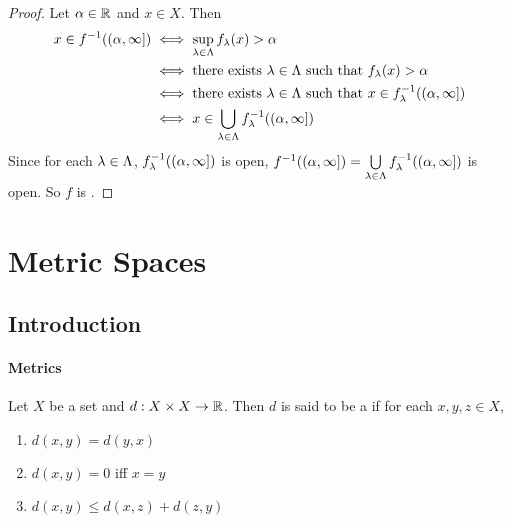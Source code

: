 \documentclass{book}
\begin{document}
	\begin{proof}
		Let $\alpha \in \mathbb{R}$ and $x \in X$. Then 
		\begin{align*}
			x \in f^{-1}((\alpha, \infty])
			& \iff \sup_{\lambda \in \Lambda} f_{\lambda}(x) > \alpha \\
			& \iff \text{there exists $\lambda \in \Lambda$ such that } f_{\lambda}(x) > \alpha \\
			& \iff \text{there exists $\lambda \in \Lambda$ such that } x \in f_{\lambda}^{-1}((\alpha, \infty]) \\
			& \iff x \in \bigcup_{\lambda \in \Lambda} f_{\lambda}^{-1}((\alpha, \infty])
		\end{align*}
		Since for each $\lambda \in \Lambda$, $f_{\lambda}^{-1}((\alpha, \infty])$ is open, $f^{-1}((\alpha, \infty]) = \bigcup\limits_{\lambda \in \Lambda} f_{\lambda}^{-1}((\alpha, \infty])$ is open. So $f$ is \lsc.
	\end{proof}





































\newpage
\chapter{Metric Spaces}

\section{Introduction}

\subsubsection{Metrics}

\begin{defn} 
	Let $X$ be a set and $d: X \times X \rightarrow \mathbb{R}$. Then $d$ is said to be a  if for each $x,y,z \in X$, 
	\begin{enumerate}
		\item $d(x,y) = d(y,x)$
		\item $d(x,y) = 0$ iff $x = y$
		\item $d(x, y) \leq d(x, z) + d(z, y)$
	\end{enumerate}	 
\end{defn}	
\end{document}
